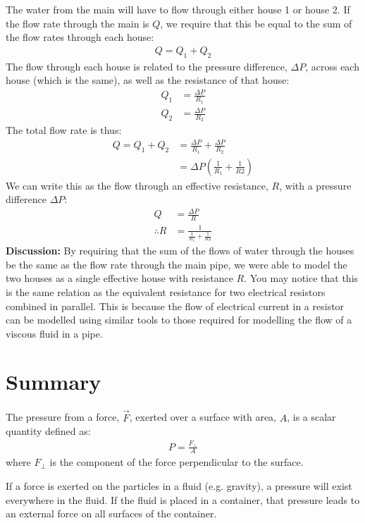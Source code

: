 {{\begin{example}
The water from the main will have to flow through either house 1 or house 2. If the flow rate through the main is $Q$, we require that this be equal to the sum of the flow rates through each house:
\begin{align*}
Q = Q_1 + Q_2
\end{align*}
The flow through each house is related to the pressure difference, $\Delta P$, across each house (which is the same), as well as the resistance of that house:
\begin{align*}
Q_1 &= \frac{\Delta P}{R_1}\\
Q_2 &= \frac{\Delta P}{R_2}
\end{align*}
The total flow rate is thus:
\begin{align*}
Q = Q_1 + Q_2&=\frac{\Delta P}{R_1}+\frac{\Delta P}{R_2}\\
&=\Delta P \left(\frac{1}{R_1}+\frac{1}{R2}\right)
\end{align*}
We can write this as the flow through an effective resistance, $R$, with a pressure difference $\Delta P$:
\begin{align*}
Q &= \frac{\Delta P}{R}\\
\therefore R&= \frac{1}{\frac{1}{R_1}+\frac{1}{R2}}
\end{align*}
\textbf{Discussion: }By requiring that the sum of the flows of water through the houses be the same as the flow rate through the main pipe, we were able to model the two houses as a single effective house with resistance $R$. You may notice that this is the same relation as the equivalent resistance for two electrical resistors combined in parallel. This is because the flow of electrical current in a resistor can be modelled using similar tools to those required for modelling the flow of a viscous fluid in a pipe. 
\end{example}


\newpage
\section{Summary}

\begin{chapterSummary}
The pressure from a force, $\vec F$, exerted over a surface with area, $A$, is a scalar quantity defined as:
\begin{align*}
P = \frac{F_\perp}{A}
\end{align*}
where $F_\perp$ is the component of the force perpendicular to the surface.

If a force is exerted on the particles in a fluid (e.g. gravity), a pressure will exist everywhere in the fluid. If the fluid is placed in a container, that pressure leads to an external force on all surfaces of the container. 


\end{chapterSummary}}}

